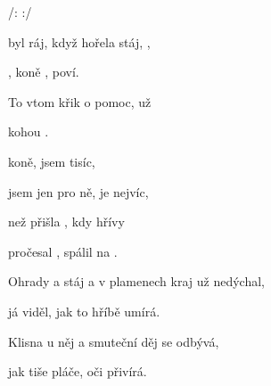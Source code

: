 

/:       :/

\zs

 byl ráj, když hořela stáj, ,

, koně , poví. 

To  vtom křik o pomoc, už 

 kohou .
\ks

\zr
{} koně,  jsem tisíc,

 jsem jen pro ně,  je nejvíc,

než přišla , kdy hřívy 

pročesal , spálil na .
\kr


\zs
Ohrady a stáj a v plamenech kraj už nedýchal,

já viděl, jak to hříbě umírá.

Klisna u něj a smuteční děj se odbývá,

jak tiše pláče, oči přivírá.

\ks

\zr
\kr
\kp

